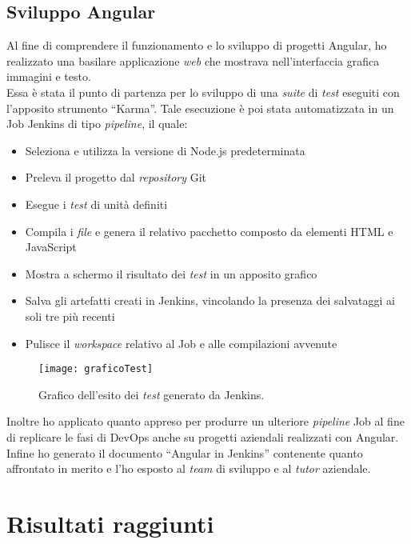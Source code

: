 \subsection{Sviluppo Angular}
Al fine di comprendere il funzionamento e lo sviluppo di progetti Angular, ho realizzato una basilare applicazione \emph{web} che mostrava nell'interfaccia grafica immagini e testo.\\
Essa è stata il punto di partenza per lo sviluppo di una \emph{suite} di \emph{test} eseguiti con l'apposito strumento “Karma”. Tale esecuzione è poi stata automatizzata in un Job Jenkins di tipo \emph{pipeline}, il quale: 
\begin{itemize}
    \item Seleziona e utilizza la versione di Node.js predeterminata
    \item Preleva il progetto dal \emph{repository} Git
    \item Esegue i \emph{test} di unità definiti
    \item Compila i \emph{file} e genera il relativo pacchetto composto da elementi HTML e JavaScript
    \item Mostra a schermo il risultato dei \emph{test} in un apposito grafico
    \item Salva gli artefatti creati in Jenkins, vincolando la presenza dei salvataggi ai soli tre più recenti
    \item Pulisce il \emph{workspace} relativo al Job e alle compilazioni avvenute  
\end{itemize}
\begin{figure}[htbp] 
    \centering 
    \texttt{[image: graficoTest]} 
    \caption{Grafico dell'esito dei \emph{test} generato da Jenkins.}
    \label{fig:graficoTest}
\end{figure}
Inoltre ho applicato quanto appreso per produrre un ulteriore \emph{pipeline} Job al fine di replicare le fasi di \gls{DevOps} anche su progetti aziendali realizzati con Angular.\\
Infine ho generato il documento “Angular in Jenkins” contenente quanto affrontato in merito e l'ho esposto al \emph{team} di sviluppo e al \emph{tutor} aziendale. 

\section{Risultati raggiunti}
